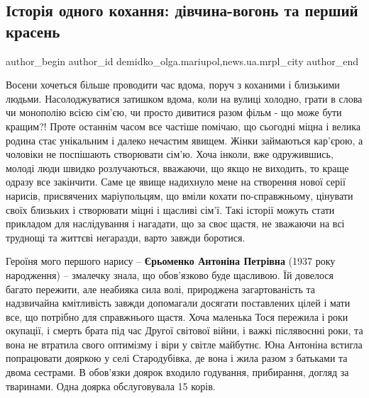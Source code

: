  
 
 
 
 
 
\subsection{Історія одного кохання: дівчина-вогонь та перший красень}
\label{sec:22_11_2019.stz.news.ua.mrpl_city.1.istoria_odnogo_kohannja_divchyna_vogon_persh_krasen}
 
\ifcmt
 author_begin
   author_id demidko_olga.mariupol,news.ua.mrpl_city
 author_end
\fi

\begingroup
\color{blue}
Восени хочеться більше проводити час вдома, поруч з коханими і близькими
людьми. Насолоджуватися затишком вдома, коли на вулиці холодно, грати в слова
чи монополію всією сім'єю, чи просто дивитися разом фільм - що може бути
кращим?! Проте останнім часом все частіше помічаю, що сьогодні міцна і велика
родина стає унікальним і далеко нечастим явищем. Жінки займаються кар'єрою, а
чоловіки не поспішають створювати сім'ю. Хоча інколи, вже одружившись, молоді
люди швидко розлучаються, вважаючи, що якщо не виходить, то краще одразу все
закінчити. Саме це явище надихнуло мене на створення нової серії нарисів,
присвячених маріупольцям, що вміли кохати по-справжньому, цінувати своїх
близьких і створювати міцні і щасливі сім'ї. Такі історії можуть стати
прикладом для наслідування і нагадати, що за своє щастя, не зважаючи на всі
труднощі та життєві негаразди, варто завжди боротися.
\endgroup


Героїня мого першого нарису – \textbf{Єрьоменко Антоніна Петрівна} (1937 року
народження) – змалечку знала, що обов'язково буде щасливою. Їй довелося багато
пережити, але неабияка сила волі, природжена загартованість та надзвичайна
кмітливість завжди допомагали досягати поставлених цілей і мати все, що
потрібно для справжнього щастя. Хоча маленька Тося пережила і роки окупації, і
смерть брата під час Другої світової війни, і важкі післявоєнні роки, та вона
не втратила свого оптимізму і віри у світле майбутнє. Юна Антоніна встигла
попрацювати дояркою у селі Стародубівка, де вона і жила разом з батьками та
двома сестрами. В обов'язки доярок входило годування, прибирання, догляд за
тваринами. Одна доярка обслуговувала 15 корів.

